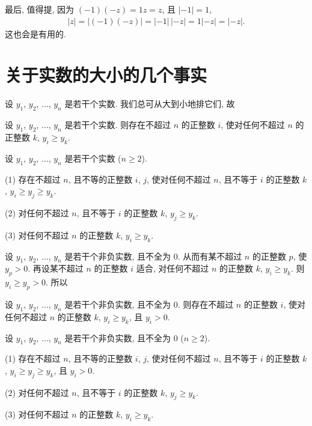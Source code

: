 \documentclass[../libro.tex]{subfiles}
\begin{document}
最后, 值得提,
因为 \((-1) (-z) = 1 z = z\),
且 \(|{-1}| = 1\),
\begin{align*}
    |z| = |{(-1) (-z)}| = |{-1}|\, |{-z}| = 1 |{-z}| = |{-z}|.
\end{align*}
这也会是有用的.

\section{关于实数的大小的几个事实}

设 \(y_1\), \(y_2\), \(\dots\), \(y_n\) 是若干个实数.
我们总可从大到小地排它们,
故

\begin{theorem}
    设 \(y_1\), \(y_2\), \(\dots\), \(y_n\) 是若干个实数.
    则存在不超过 \(n\) 的正整数 \(i\),
    使对任何不超过 \(n\) 的正整数 \(k\),
    \(y_i \geq y_k\).
\end{theorem}

\begin{theorem}
    设 \(y_1\), \(y_2\), \(\dots\), \(y_n\) 是若干个实数
    (\(n \geq 2\)).

    (1)
    存在不超过 \(n\), 且不等的正整数 \(i\), \(j\),
    使对任何不超过 \(n\), 且不等于 \(i\) 的正整数 \(k\),
    \(y_i \geq y_j \geq y_k\).

    (2)
    对任何不超过 \(n\), 且不等于 \(i\) 的正整数 \(k\),
    \(y_j \geq y_k\).

    (3)
    对任何不超过 \(n\) 的正整数 \(k\),
    \(y_i \geq y_k\).
\end{theorem}

设 \(y_1\), \(y_2\), \(\dots\), \(y_n\) 是若干个非负实数,
且不全为 \(0\).
从而有某不超过 \(n\) 的正整数 \(p\), 使 \(y_p > 0\).
再设某不超过 \(n\) 的正整数 \(i\) 适合,
对任何不超过 \(n\) 的正整数 \(k\),
\(y_i \geq y_k\).
则 \(y_i \geq y_p > 0\).
所以

\begin{theorem}
    设 \(y_1\), \(y_2\), \(\dots\), \(y_n\) 是若干个非负实数,
    且不全为 \(0\).
    则存在不超过 \(n\) 的正整数 \(i\),
    使对任何不超过 \(n\) 的正整数 \(k\),
    \(y_i \geq y_k\),
    且 \(y_i > 0\).
\end{theorem}

\begin{theorem}
    设 \(y_1\), \(y_2\), \(\dots\), \(y_n\) 是若干个非负实数,
    且不全为 \(0\) (\(n \geq 2\)).

    (1)
    存在不超过 \(n\), 且不等的正整数 \(i\), \(j\),
    使对任何不超过 \(n\), 且不等于 \(i\) 的正整数 \(k\),
    \(y_i \geq y_j \geq y_k\),
    且 \(y_i > 0\).

    (2)
    对任何不超过 \(n\), 且不等于 \(i\) 的正整数 \(k\),
    \(y_j \geq y_k\).

    (3)
    对任何不超过 \(n\) 的正整数 \(k\),
    \(y_i \geq y_k\).

\end{theorem}
\end{document}
